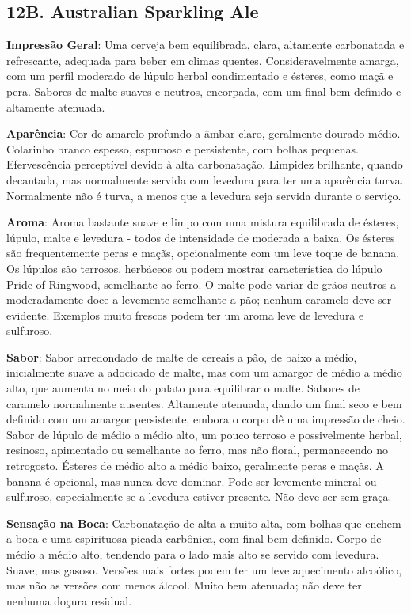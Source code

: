 \subsection*{12B. Australian Sparkling Ale}

\textbf{Impressão Geral}: Uma cerveja bem equilibrada, clara, altamente carbonatada e refrescante, adequada para beber em climas quentes. Consideravelmente amarga, com um perfil moderado de lúpulo herbal condimentado e ésteres, como maçã e pera. Sabores de malte suaves e neutros, encorpada, com um final bem definido e altamente atenuada.

\textbf{Aparência}: Cor de amarelo profundo a âmbar claro, geralmente dourado médio. Colarinho branco espesso, espumoso e persistente, com bolhas pequenas. Efervescência perceptível devido à alta carbonatação. Limpidez brilhante, quando decantada, mas normalmente servida com levedura para ter uma aparência turva. Normalmente não é turva, a menos que a levedura seja servida durante o serviço.

\textbf{Aroma}: Aroma bastante suave e limpo com uma mistura equilibrada de ésteres, lúpulo, malte e levedura - todos de intensidade de moderada a baixa. Os ésteres são frequentemente peras e maçãs, opcionalmente com um leve toque de banana. Os lúpulos são terrosos, herbáceos ou podem mostrar característica do lúpulo Pride of Ringwood, semelhante ao ferro. O malte pode variar de grãos neutros a moderadamente doce a levemente semelhante a pão; nenhum caramelo deve ser evidente. Exemplos muito frescos podem ter um aroma leve de levedura e sulfuroso.

\textbf{Sabor}: Sabor arredondado de malte de cereais a pão, de baixo a médio, inicialmente suave a adocicado de malte, mas com um amargor de médio a médio alto, que aumenta no meio do palato para equilibrar o malte. Sabores de caramelo normalmente ausentes. Altamente atenuada, dando um final seco e bem definido com um amargor persistente, embora o corpo dê uma impressão de cheio. Sabor de lúpulo de médio a médio alto, um pouco terroso e possivelmente herbal, resinoso, apimentado ou semelhante ao ferro, mas não floral, permanecendo no retrogosto. Ésteres de médio alto a médio baixo, geralmente peras e maçãs. A banana é opcional, mas nunca deve dominar. Pode ser levemente mineral ou sulfuroso, especialmente se a levedura estiver presente. Não deve ser sem graça.

\textbf{Sensação na Boca}: Carbonatação de alta a muito alta, com bolhas que enchem a boca e uma espirituosa picada carbônica, com final bem definido. Corpo de médio a médio alto, tendendo para o lado mais alto se servido com levedura. Suave, mas gasoso. Versões mais fortes podem ter um leve aquecimento alcoólico, mas não as versões com menos álcool. Muito bem atenuada; não deve ter nenhuma doçura residual.

